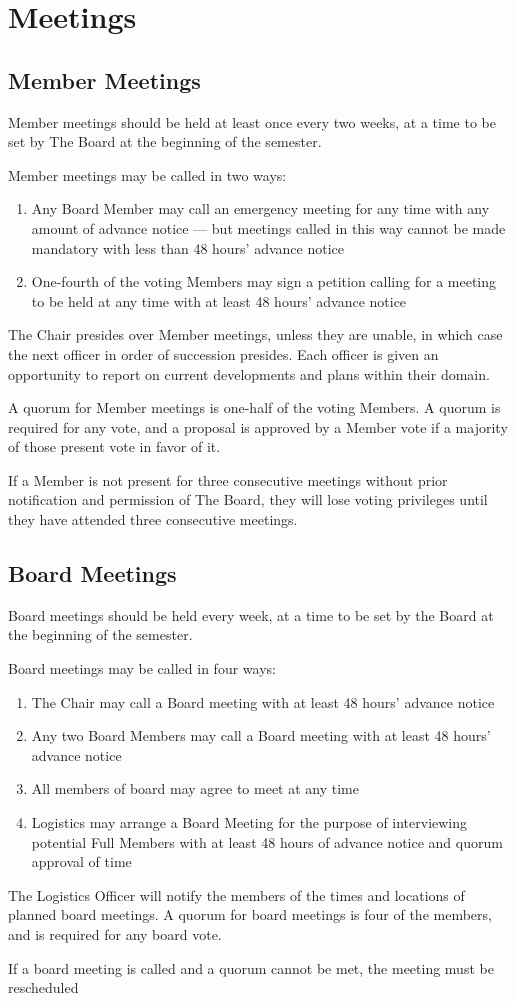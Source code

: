 \section{Meetings}
\label{sec:meetings}



\subsection{Member Meetings}

Member meetings should be held at least once every two weeks, at a time to be set by The Board at the beginning of the semester.

Member meetings may be called in two ways:
\begin{enumerate}
	\item Any Board Member may call an emergency meeting for any time with any amount of advance notice --- but meetings called in this way cannot be made mandatory with less than 48 hours' advance notice
	\item One-fourth of the voting Members may sign a petition calling for a meeting to be held at any time with at least 48 hours' advance notice
\end{enumerate}

The Chair presides over Member meetings, unless they are unable, in which case the next officer in order of succession presides. Each officer is given an opportunity to report on current developments and plans within their domain.

A quorum for Member meetings is one-half of the voting Members. A quorum is required for any vote, and a proposal is approved by a Member vote if a majority of those present vote in favor of it.

If a Member is not present for three consecutive meetings without prior notification and permission of The Board, they will lose voting privileges until they have attended three consecutive meetings.



\subsection{Board Meetings}

Board meetings should be held every week, at a time to be set by the Board at the beginning of the semester.

Board meetings may be called in four ways:
\begin{enumerate}
	\item The Chair may call a Board meeting with at least 48 hours' advance notice
	\item Any two Board Members may call a Board meeting with at least 48 hours' advance notice
	\item All members of board may agree to meet at any time
	\item Logistics may arrange a Board Meeting for the purpose of interviewing potential Full Members with at least 48 hours of advance notice and quorum approval of time
\end{enumerate}

The Logistics Officer will notify the members of the times and locations of planned board meetings. A quorum for board meetings is four of the members, and is required for any board vote.

If a board meeting is called and a quorum cannot be met, the meeting must be rescheduled
